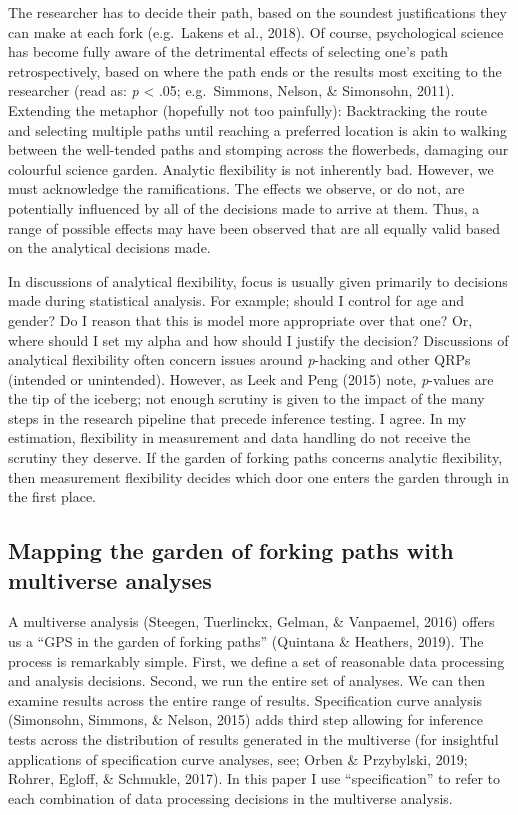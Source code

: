 \documentclass[
  english,
  man,floatsintext]{apa6}
\begin{document}
The researcher has to decide their path, based on the soundest justifications they can make at each fork (e.g.~Lakens et al., 2018). Of course, psychological science has become fully aware of the detrimental effects of selecting one's path retrospectively, based on where the path ends or the results most exciting to the researcher (read as: \emph{p} \textless{} .05; e.g.~Simmons, Nelson, \& Simonsohn, 2011). Extending the metaphor (hopefully not too painfully): Backtracking the route and selecting multiple paths until reaching a preferred location is akin to walking between the well-tended paths and stomping across the flowerbeds, damaging our colourful science garden. Analytic flexibility is not inherently bad. However, we must acknowledge the ramifications. The effects we observe, or do not, are potentially influenced by all of the decisions made to arrive at them. Thus, a range of possible effects may have been observed that are all equally valid based on the analytical decisions made.

In discussions of analytical flexibility, focus is usually given primarily to decisions made during statistical analysis. For example; should I control for age and gender? Do I reason that this is model more appropriate over that one? Or, where should I set my alpha and how should I justify the decision? Discussions of analytical flexibility often concern issues around \emph{p}-hacking and other QRPs (intended or unintended). However, as Leek and Peng (2015) note, \emph{p}-values are the tip of the iceberg; not enough scrutiny is given to the impact of the many steps in the research pipeline that precede inference testing. I agree. In my estimation, flexibility in measurement and data handling do not receive the scrutiny they deserve. If the garden of forking paths concerns analytic flexibility, then measurement flexibility decides which door one enters the garden through in the first place.

\hypertarget{mapping-the-garden-of-forking-paths-with-multiverse-analyses}{%
\subsection{Mapping the garden of forking paths with multiverse analyses}\label{mapping-the-garden-of-forking-paths-with-multiverse-analyses}}

A multiverse analysis (Steegen, Tuerlinckx, Gelman, \& Vanpaemel, 2016) offers us a \enquote{GPS in the garden of forking paths} (Quintana \& Heathers, 2019). The process is remarkably simple. First, we define a set of reasonable data processing and analysis decisions. Second, we run the entire set of analyses. We can then examine results across the entire range of results. Specification curve analysis (Simonsohn, Simmons, \& Nelson, 2015) adds third step allowing for inference tests across the distribution of results generated in the multiverse (for insightful applications of specification curve analyses, see; Orben \& Przybylski, 2019; Rohrer, Egloff, \& Schmukle, 2017). In this paper I use \enquote{specification} to refer to each combination of data processing decisions in the multiverse analysis.
\end{document}
